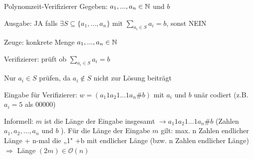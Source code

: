 \begin{example2}{Polynomzeit-Verifizierer}
    Gegeben: $a_1, ... , a_n \in \mathbb{N}$ und $b$

    Ausgabe: JA falls $\exists S \subseteq \{a_1, ... , a_n\}$ mit $\sum_{a_i \in S} a_i = b$, sonst NEIN

    \vspace{2mm}

    Zeuge: konkrete Menge $a_1, ... , a_n \in \mathbb{N}$

    Verifizierer: prüft ob $\sum_{a_i \in S} a_i = b$

    Nur $a_i \in S$ prüfen, da $a_i \notin S$ nicht zur Lösung beiträgt

    Eingabe für Verifizierer: $w = (a_1 1 a_2 1 ... 1 a_n \# b)$
    mit $a_i$ und $b$ unär codiert (z.B. $a_i = 5$ als 00000)

    \vspace{2mm}

    Informell:
    $m$ ist die Länge der Eingabe insgesamt $\rightarrow a_1 1 a_2 1 \ldots 1 a_n \# b$ (Zahlen $a_1, a_2, \ldots, a_n$ und $b$ ). Für die Länge der Eingabe $m$ gilt: max. n Zahlen endlicher Länge + n-mal die „1" $+\mathrm{b}$ mit endlicher Länge (bzw. n Zahlen endlicher Länge) $\Rightarrow$ Länge $(2 m) \in \mathcal{O}(n)$
    
\end{example2}













